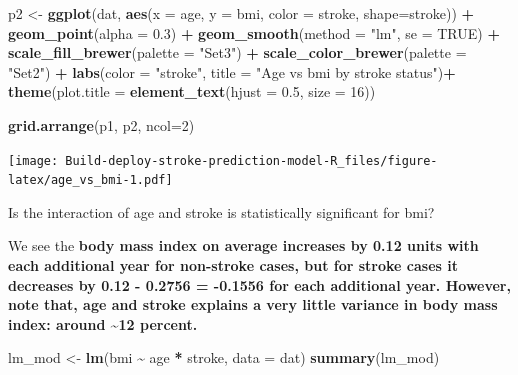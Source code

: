 \documentclass[
]{article}
\newenvironment{Shaded}{\begin{snugshade}}{\end{snugshade}}
\newcommand{\AttributeTok}[1]{\textcolor[rgb]{0.13,0.29,0.53}{#1}}
\newcommand{\ConstantTok}[1]{\textcolor[rgb]{0.56,0.35,0.01}{#1}}
\newcommand{\DecValTok}[1]{\textcolor[rgb]{0.00,0.00,0.81}{#1}}
\newcommand{\FloatTok}[1]{\textcolor[rgb]{0.00,0.00,0.81}{#1}}
\newcommand{\FunctionTok}[1]{\textcolor[rgb]{0.13,0.29,0.53}{\textbf{#1}}}
\newcommand{\NormalTok}[1]{#1}
\newcommand{\OtherTok}[1]{\textcolor[rgb]{0.56,0.35,0.01}{#1}}
\newcommand{\SpecialCharTok}[1]{\textcolor[rgb]{0.81,0.36,0.00}{\textbf{#1}}}
\newcommand{\StringTok}[1]{\textcolor[rgb]{0.31,0.60,0.02}{#1}}
\begin{document}
\begin{Shaded}
\begin{Highlighting}[]
\NormalTok{p2 }\OtherTok{\textless{}{-}} \FunctionTok{ggplot}\NormalTok{(dat, }\FunctionTok{aes}\NormalTok{(}\AttributeTok{x =}\NormalTok{ age, }\AttributeTok{y =}\NormalTok{ bmi, }\AttributeTok{color =}\NormalTok{ stroke, }\AttributeTok{shape=}\NormalTok{stroke)) }\SpecialCharTok{+}
      \FunctionTok{geom\_point}\NormalTok{(}\AttributeTok{alpha =} \FloatTok{0.3}\NormalTok{) }\SpecialCharTok{+}
      \FunctionTok{geom\_smooth}\NormalTok{(}\AttributeTok{method =} \StringTok{"lm"}\NormalTok{, }\AttributeTok{se =} \ConstantTok{TRUE}\NormalTok{) }\SpecialCharTok{+}
      \FunctionTok{scale\_fill\_brewer}\NormalTok{(}\AttributeTok{palette =} \StringTok{"Set3"}\NormalTok{) }\SpecialCharTok{+}
      \FunctionTok{scale\_color\_brewer}\NormalTok{(}\AttributeTok{palette =} \StringTok{"Set2"}\NormalTok{) }\SpecialCharTok{+}
      \FunctionTok{labs}\NormalTok{(}\AttributeTok{color =} \StringTok{"stroke"}\NormalTok{, }\AttributeTok{title =} \StringTok{"Age vs bmi by stroke status"}\NormalTok{)}\SpecialCharTok{+}
      \FunctionTok{theme}\NormalTok{(}\AttributeTok{plot.title =} \FunctionTok{element\_text}\NormalTok{(}\AttributeTok{hjust =} \FloatTok{0.5}\NormalTok{, }\AttributeTok{size =} \DecValTok{16}\NormalTok{))}


\FunctionTok{grid.arrange}\NormalTok{(p1, p2, }\AttributeTok{ncol=}\DecValTok{2}\NormalTok{)}
\end{Highlighting}
\end{Shaded}

\texttt{[image: Build-deploy-stroke-prediction-model-R\_files/figure-latex/age\_vs\_bmi-1.pdf]}

Is the interaction of age and stroke is statistically significant for
bmi?

We see the \textbf{body mass index on average increases by 0.12 units
with each additional year for non-stroke cases, but for stroke cases it
decreases by 0.12 - 0.2756 = -0.1556 for each additional year. However,
note that, age and stroke explains a very little variance in body mass
index: around \textasciitilde12 percent.}

\begin{Shaded}
\begin{Highlighting}[]
\NormalTok{lm\_mod }\OtherTok{\textless{}{-}} \FunctionTok{lm}\NormalTok{(bmi }\SpecialCharTok{\textasciitilde{}}\NormalTok{ age }\SpecialCharTok{*}\NormalTok{ stroke, }\AttributeTok{data =}\NormalTok{ dat)}
\FunctionTok{summary}\NormalTok{(lm\_mod)}
\end{Highlighting}
\end{Shaded}
\end{document}
